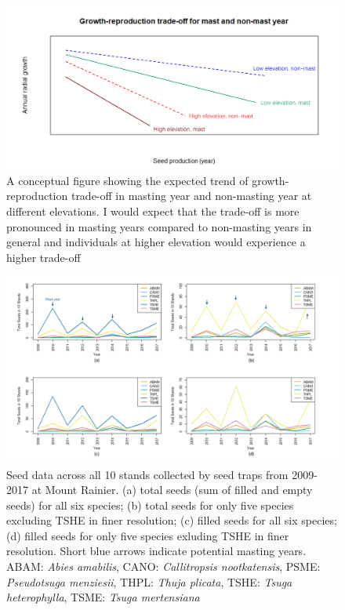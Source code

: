 \documentclass[11pt,letter]{article}
\begin{document}
\begin{figure}[htb]
	\centering
	\includegraphics[width=1\linewidth]{conceptualFigureChap2.png}
	\caption{A conceptual figure showing the expected trend of growth-reproduction trade-off in masting year and non-masting year at different elevations. I would expect that the trade-off is more pronounced in masting years compared to non-masting years in general and individuals at higher elevation would experience a higher trade-off}
	\label{fig:conceptual2}
\end{figure}
\begin{figure}[htb]
	\centering
	\includegraphics[width=1\linewidth]{seed.png}
	\caption{Seed data across all 10 stands collected by seed traps from 2009-2017 at Mount Rainier. (a) total seeds (sum of filled and empty seeds) for all six species; (b) total seeds for only five species excluding TSHE in finer resolution; (c) filled seeds for all six species; (d) filled seeds for only five species exluding TSHE in finer resolution. Short blue arrows indicate potential masting years. ABAM: \textit{Abies amabilis}, CANO:  \textit{Callitropsis nootkatensis}, PSME: \textit{Pseudotsuga menziesii}, THPL: \textit{Thuja plicata}, TSHE: \textit{Tsuga heterophylla}, TSME: \textit{Tsuga mertensiana}}
	\label{fig:seed}
\end{figure}
\end{document}
